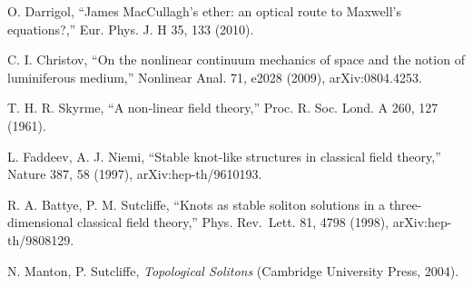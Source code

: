 \documentclass[
  11pt,
]{article}
\begin{document}
\begin{list}{}{\setlength{\leftmargin}{2.5em}\setlength{\labelwidth}{2.2em}\setlength{\labelsep}{0.3em}\setlength{\itemsep}{1pt}\setlength{\parsep}{0pt}\setlength{\topsep}{2pt}}
\item[{[57]}] O. Darrigol, ``James MacCullagh's ether: an optical route
to Maxwell's equations?,'' Eur. Phys. J. H 35, 133 (2010).

\item[{[58]}] C. I. Christov, ``On the nonlinear continuum mechanics of
space and the notion of luminiferous medium,'' Nonlinear Anal. 71, e2028
(2009), arXiv:0804.4253.

\item[{[59]}] T. H. R. Skyrme, ``A non-linear field theory,'' Proc. R.
Soc. Lond. A 260, 127 (1961).

\item[{[60]}] L. Faddeev, A. J. Niemi, ``Stable knot-like structures in
classical field theory,'' Nature 387, 58 (1997), arXiv:hep-th/9610193.

\item[{[61]}] R. A. Battye, P. M. Sutcliffe, ``Knots as stable soliton
solutions in a three-dimensional classical field theory,'' Phys.
Rev.~Lett. 81, 4798 (1998), arXiv:hep-th/9808129.

\item[{[62]}] N. Manton, P. Sutcliffe, \emph{Topological Solitons}
(Cambridge University Press, 2004).

\end{list}\endgroup
\end{document}
